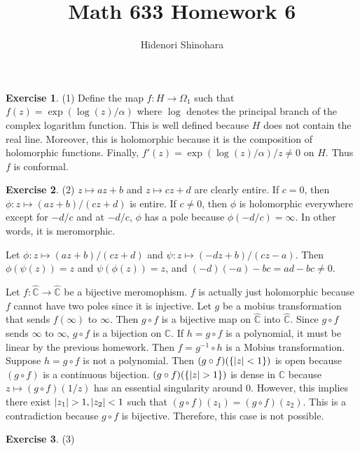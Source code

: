 \documentclass[12pt, psamsfonts]{amsart}
\theoremstyle{definition}
\newtheorem*{exer}{Exercise}
\theoremstyle{remark}
\numberwithin{equation}{section}
\begin{document}
\title{Math 633 Homework 6}
\author{Hidenori Shinohara}
\maketitle


\begin{exer}{(1)}
  Define the map $f: H \rightarrow \Omega_1$ such that $f(z) = \exp(\log(z)/\alpha)$ where $\log$ denotes the principal branch of the complex logarithm function.
  This is well defined because $H$ does not contain the real line.
  Moreover, this is holomorphic because it is the composition of holomorphic functions.
  Finally, $f'(z) = \exp(\log(z)/\alpha) / z \ne 0$ on $H$.
  Thus $f$ is conformal.
\end{exer}

\begin{exer}{(2)}
  $z \mapsto az + b$ and $z \mapsto cz + d$ are clearly entire.
  If $c = 0$, then $\phi: z \mapsto (az + b) / (cz + d)$ is entire.
  If $c \ne 0$, then $\phi$ is holomorphic everywhere except for $-d / c$ and at $-d / c$, $\phi$ has a pole because $\phi(-d / c) = \infty$.
  In other words, it is meromorphic.

  Let $\phi: z \mapsto (az + b) / (cz + d)$ and $\psi: z \mapsto (-dz + b) / (cz - a)$.
  Then $\phi(\psi(z)) = z$ and $\psi(\phi(z)) = z$, and $(-d)(-a) - bc = ad - bc \ne 0$.

  Let $f:\hat{\mathbb{C}} \rightarrow \hat{\mathbb{C}}$ be a bijective meromophism.
  $f$ is actually just holomorphic because $f$ cannot have two poles since it is injective.
  Let $g$ be a mobius transformation that sends $f(\infty)$ to $\infty$.
  Then $g \circ f$ is a bijective map on $\hat{\mathbb{C}}$ into $\hat{\mathbb{C}}$.
  Since $g \circ f$ sends $\infty$ to $\infty$, $g \circ f$ is a bijection on $\mathbb{C}$.
  If $h = g \circ f$ is a polynomial, it must be linear by the previous homework.
  Then $f = g^{-1} \circ h$ is a Mobius transformation.
  Suppose $h = g \circ f$ is not a polynomial.
  Then $(g \circ f)(\{ \abs{z} < 1 \})$ is open because $(g \circ f)$ is a continuous bijection.
  $(g \circ f)(\{ \abs{z} > 1 \})$ is dense in $\mathbb{C}$ because $z \mapsto (g \circ f)(1 / z)$ has an essential singularity around $0$.
  However, this implies there exist $\abs{z_1} > 1, \abs{z_2} < 1$ such that $(g \circ f)(z_1) = (g \circ f)(z_2)$.
  This is a contradiction because $g \circ f$ is bijective.
  Therefore, this case is not possible.
\end{exer}

\begin{exer}{(3)}
  \todo[inline,caption={}]{
  }
\end{exer}
\end{document}

